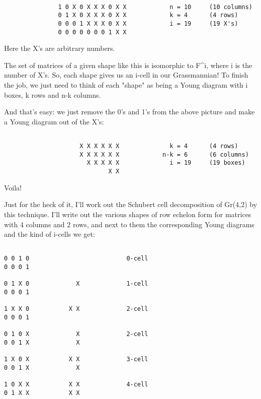 \begin{verbatim}

               1 0 X 0 X X X 0 X X            n = 10     (10 columns)
               0 1 X 0 X X X 0 X X            k = 4      (4 rows)
               0 0 0 1 X X X 0 X X            i = 19     (19 X's)
               0 0 0 0 0 0 0 1 X X
\end{verbatim}
    
Here the X's are arbitrary numbers.  


The set of matrices of a given shape like this is isomorphic to
F^{i}, where i is the number of X's.  So, each shape gives us an
i-cell in our Grassmannian!  To finish the job, we just need to think of
each "shape" as being a Young diagram with i boxes, k rows and
n-k columns.

And that's easy: we just remove the 0's and 1's from the above picture
and make a Young diagram out of the X's:
               

\begin{verbatim}

                     X X X X X X              k = 4      (4 rows)
                     X X X X X X            n-k = 6      (6 columns)
                       X X X X X              i = 19     (19 boxes)
                             X X
\end{verbatim}
    
Voila!

Just for the heck of it, I'll work out the Schubert cell decomposition
of Gr(4,2) by this technique.   I'll write out the various shapes of 
row echelon form for matrices with 4 columns and 2 rows, and next to 
them the corresponding Young diagrams and the kind of i-cells we get:


\begin{verbatim}

0 0 1 0                           0-cell
0 0 0 1         
  
0 1 X 0             X             1-cell
0 0 0 1                 

1 X X 0           X X             2-cell
0 0 0 1     

0 1 0 X             X             2-cell
0 0 1 X             X

1 X 0 X           X X             3-cell
0 0 1 X             X

1 0 X X           X X             4-cell
0 1 X X           X X

\end{verbatim}
    
